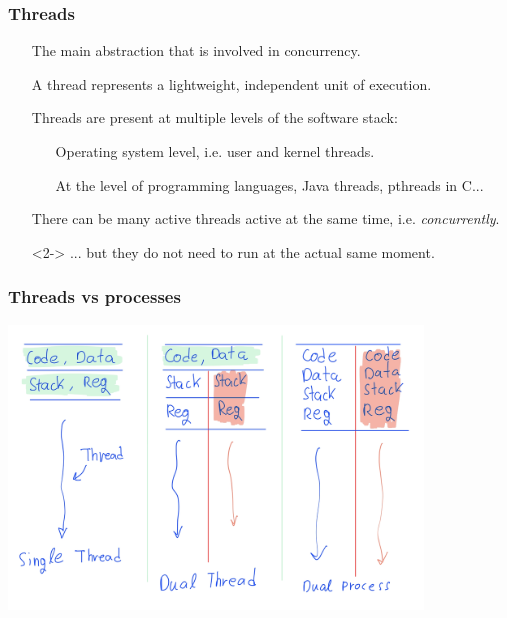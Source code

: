 \documentclass[xcolor={dvipsnames,svgnames},aspectratio=169]{beamer}
\begin{document}
\begin{frame}[fragile]
  \frametitle{Threads}

  \begin{itemize}
  \item[\faBook] The main abstraction that is involved in concurrency.
  \item[\faBook] A thread represents a lightweight, independent unit of
    execution.
  \item[\faBook] Threads are present at multiple levels of the
    software stack:
    \begin{itemize}
    \item[\faLinux] Operating system level, i.e. user and kernel threads.
    \item[\faCode] At the level of programming languages, Java threads, pthreads
      in C...
    \end{itemize}
  \item[\faBook] There can be many active threads active at the same time, i.e.
    \emph{concurrently}.
  \item[\faExclamation]<2-> ... but they do not need to run at the actual same moment.
  \end{itemize}
\end{frame}

\begin{frame}[fragile]
  \frametitle{Threads vs processes}

  \begin{center}
    \includegraphics[width=11cm,keepaspectratio]{media/lecture1-threads.png}
  \end{center}

\end{frame}
\end{document}
